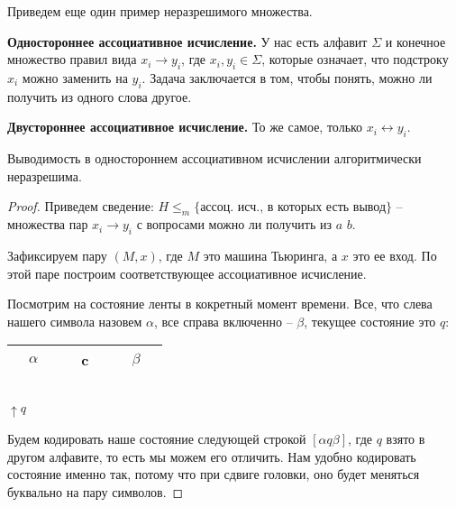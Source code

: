 \vspace{5mm}

Приведем еще один пример неразрешимого множества. 

\textbf{Одностороннее ассоциативное исчисление.} У нас есть алфавит $\Sigma$ и конечное множество правил вида $x_i \to y_i$, где $x_i, y_i \in \Sigma$, которые означает, что подстроку $x_i$ можно заменить на $y_i$. Задача заключается в том, чтобы понять, можно ли получить из одного слова другое. 

\textbf{Двустороннее ассоциативное исчисление.} То же самое, только $x_i \leftrightarrow y_i$.

\begin{theorem}
    Выводимость в одностороннем ассоциативном исчислении алгоритмически неразрешима.
\end{theorem}
\begin{proof}
    Приведем сведение: $H \leqslant_m \{\text{ассоц. исч., в которых есть вывод}\}$ -- множества пар $x_i \to y_i$ с вопросами можно ли получить из $a$ $b$.

    Зафиксируем пару $(M, x)$, где $M$ это машина Тьюринга, а $x$ это ее вход. По этой паре построим соответствующее ассоциативное исчисление.

    Посмотрим на состояние ленты в кокретный момент времени. Все, что слева нашего символа назовем $\alpha$, все справа включенно -- $\beta$, текущее состояние это $q$: 
    \begin{center}
        \begin{tabular}{|c|c|c|c|c|c|c|c|c|}
            \hline
             & $\alpha$ &  &  & c &  &  & $\beta$ & \\
            \hline
        \end{tabular}\\
        $\uparrow q$
    \end{center}
    Будем кодировать наше состояние следующей строкой $[\alpha q \beta]$, где $q$ взято в другом алфавите, то есть мы можем его отличить. 
    Нам удобно кодировать состояние именно так, потому что при сдвиге головки, оно будет меняться буквально на пару символов.


\end{proof}
